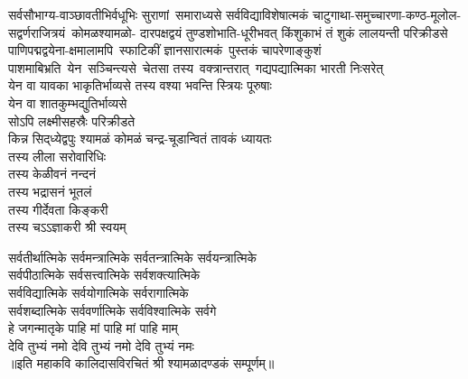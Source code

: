 \begin{multicols}{2}
\begin{flushleft}
\medskip
सर्वसौभाग्य-वाञ्छावतीभिर्वधूभिः
सुराणां~समाराध्यसे सर्वविद्याविशेषात्मकं
चाटुगाथा-समुच्चारणा-कण्ठ-मूलोल-
सद्वर्णराजित्रयं~कोमळश्यामळो-
दारपक्षद्वयं तुण्डशोभाति-धूरीभवत् 
किंशुकाभं तं शुकं लालयन्ती परिक्रीडसे\\
\medskip
\mbox{पाणिपद्मद्वयेना-क्षमालामपि~स्फाटिकीं}
ज्ञानसारात्मकं~पुस्तकं चापरेणाङ्कुशं
पाशमाबिभ्रति~येन~सञ्चिन्त्यसे~चेतसा 
तस्य~वक्त्रान्तरात्~गद्यपद्यात्मिका
भारती निःसरेत्\\
\medskip
येन वा यावका भाकृतिर्भाव्यसे
तस्य  वश्या भवन्ति स्त्रियः पूरुषाः\\
येन वा शातकुम्भद्युतिर्भाव्यसे\\
सोऽपि लक्ष्मीसहस्रैः परिक्रीडते\\
\medskip
किन्न सिद्‌ध्येद्वपुः श्यामळं कोमळं 
चन्द्र-चूडान्वितं तावकं ध्यायतः\\
तस्य लीला सरोवारिधिः\\
तस्य केळीवनं नन्दनं\\
तस्य भद्रासनं भूतलं\\
तस्य गीर्देवता किङ्करी\\
तस्य चऽऽज्ञाकरी श्री स्वयम्\\
\end{flushleft}
\end{multicols}
\begin{center}
सर्वतीर्थात्मिके सर्वमन्त्रात्मिके सर्वतन्त्रात्मिके सर्वयन्त्रात्मिके\\
सर्वपीठात्मिके सर्वसत्त्वात्मिके सर्वशक्त्यात्मिके\\
सर्वविद्यात्मिके सर्वयोगात्मिके सर्वरागात्मिके\\
सर्वशब्दात्मिके सर्ववर्णात्मिके सर्वविश्वात्मिके सर्वगे\\
हे जगन्मातृके पाहि मां पाहि मां पाहि माम् \\
देवि तुभ्यं नमो देवि तुभ्यं नमो देवि तुभ्यं नमः\\
॥इति महाकवि कालिदासविरचितं श्री श्यामळादण्डकं सम्पूर्णम्॥
\end{center}